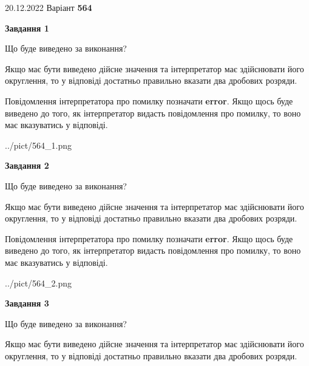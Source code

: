 \documentclass[12pt, ukrainian]{article}
\begin{document}
{20.12.2022 Варіант \No \textbf { 564 }\par}
{
\begin {Large}

{\begin {center}\textbf{Завдання 1}\end {center}}\par
Що буде виведено за виконання? \par

Якщо має бути виведено дійсне значення та інтерпретатор має здійснювати його округлення, 
то у відповіді достатньо правильно вказати два дробових розряди.

Повідомлення інтерпретатора про помилку позначати \textbf{error}.
Якщо щось буде виведено до того, як інтерпретатор видасть повідомлення про помилку, 
то воно має вказуватись у відповіді. \par

\begin{center}
	{../pict/564_1.png}
\end{center}
\newpage

{\begin {center}\textbf{Завдання 2}\end {center}}\par
Що буде виведено за виконання? \par

Якщо має бути виведено дійсне значення та інтерпретатор має здійснювати його округлення, 
то у відповіді достатньо правильно вказати два дробових розряди.

Повідомлення інтерпретатора про помилку позначати \textbf{error}.
Якщо щось буде виведено до того, як інтерпретатор видасть повідомлення про помилку, 
то воно має вказуватись у відповіді. \par

\begin{center}
	{../pict/564_2.png}
\end{center}
\newpage

{\begin {center}\textbf{Завдання 3}\end {center}}\par
Що буде виведено за виконання? \par

Якщо має бути виведено дійсне значення та інтерпретатор має здійснювати його округлення, 
то у відповіді достатньо правильно вказати два дробових розряди.


\end{Large}}
\end{document}
